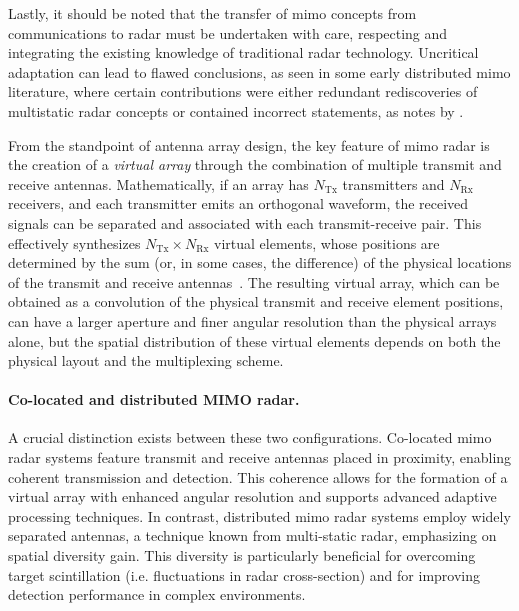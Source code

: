 Lastly, it should be noted that the transfer of \gls{mimo} concepts from communications to radar must be undertaken with care, respecting and integrating the existing knowledge of traditional radar technology.
Uncritical adaptation can lead to flawed conclusions, as seen in some early distributed \gls{mimo} literature, where certain contributions were either redundant rediscoveries of multistatic radar concepts or contained incorrect statements, as notes by \textcite{chernyakConceptMIMORadar2010}.

From the standpoint of antenna array design, the key feature of \gls{mimo} radar is the creation of a \emph{virtual array} through the combination of multiple transmit and receive antennas.
Mathematically, if an array has $N_\mathrm{Tx}$ transmitters and $N_\mathrm{Rx}$ receivers, and each transmitter emits an orthogonal waveform, the received signals can be separated and associated with each transmit-receive pair.
This effectively synthesizes $N_\mathrm{Tx} \times N_\mathrm{Rx}$ virtual elements, whose positions are determined by the sum (or, in some cases, the difference) of the physical locations of the transmit and receive antennas~\parencite{holderSystematicMethodsSynthesis2023}.
The resulting virtual array, which can be obtained as a convolution of the physical transmit and receive element positions, can have a larger aperture and finer angular resolution than the physical arrays alone, but the spatial distribution of these virtual elements depends on both the physical layout and the multiplexing scheme.

\paragraph{Co-located and distributed MIMO radar.}
A crucial distinction exists between these two configurations.
Co-located \gls{mimo} radar systems feature transmit and receive antennas placed in proximity, enabling coherent transmission and detection.
This coherence allows for the formation of a virtual array with enhanced angular resolution and supports advanced adaptive processing techniques.
In contrast, distributed \gls{mimo} radar systems employ widely separated antennas, a technique known from multi-static radar, emphasizing on spatial diversity gain.
This diversity is particularly beneficial for overcoming target scintillation (i.e. fluctuations in radar cross-section) and for improving detection performance in complex environments.

